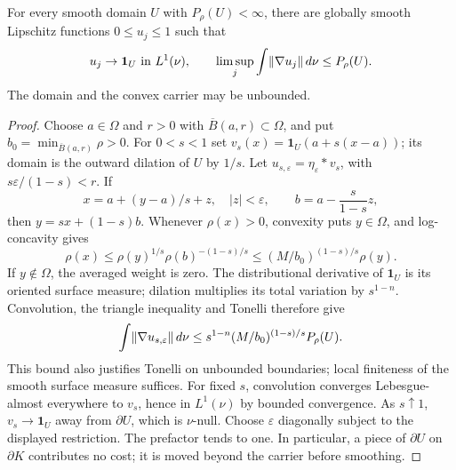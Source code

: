 \begin{lemma}
  \label{lem:relative-perimeter-smoothing}
  \leanok
  For every smooth domain $U$ with $P_\rho(U)<\infty$, there are globally smooth Lipschitz
  functions $0\le u_j\le1$ such that
  \[
    u_j\to\mathbf1_U\text{ in }L^1(\nu),\qquad
    \limsup_j\int\lVert\nabla u_j\rVert\,d\nu\le P_\rho(U).
  \]
  The domain and the convex carrier may be unbounded.
\end{lemma}
\begin{proof}
  \leanok
  Choose $a\in\Omega$ and $r>0$ with $\overline B(a,r)\subset\Omega$, and put
  $b_0=\min_{\overline B(a,r)}\rho>0$. For $0<s<1$ set
  $v_s(x)=\mathbf1_U(a+s(x-a))$; its domain is the outward dilation of $U$ by $1/s$.
  Let $u_{s,\varepsilon}=\eta_\varepsilon*v_s$, with
  $s\varepsilon/(1-s)<r$. If
  \[
    x=a+(y-a)/s+z,\quad |z|<\varepsilon,\qquad
    b=a-\frac{s}{1-s}z,
  \]
  then $y=sx+(1-s)b$. Whenever $\rho(x)>0$, convexity puts $y\in\Omega$, and log-concavity gives
  \[
    \rho(x)\le\rho(y)^{1/s}\rho(b)^{-(1-s)/s}
       \le (M/b_0)^{(1-s)/s}\rho(y).
  \]
  If $y\notin\Omega$, the averaged weight is zero. The distributional derivative of
  $\mathbf1_U$ is its oriented surface measure; dilation multiplies its total variation by
  $s^{1-n}$. Convolution, the triangle inequality and Tonelli therefore give
  \[
    \int\lVert\nabla u_{s,\varepsilon}\rVert\,d\nu
      \le s^{1-n}(M/b_0)^{(1-s)/s}P_\rho(U).
  \]
  This bound also justifies Tonelli on unbounded boundaries; local finiteness of the smooth
  surface measure suffices. For fixed $s$, convolution converges Lebesgue-almost everywhere
  to $v_s$, hence in $L^1(\nu)$ by bounded convergence. As $s\uparrow1$, $v_s\to\mathbf1_U$
  away from $\partial U$, which is $\nu$-null. Choose $\varepsilon$ diagonally subject to
  the displayed restriction. The prefactor tends to one. In particular, a piece of
  $\partial U$ on $\partial K$ contributes no cost; it is moved beyond the carrier before
  smoothing.
\end{proof}

